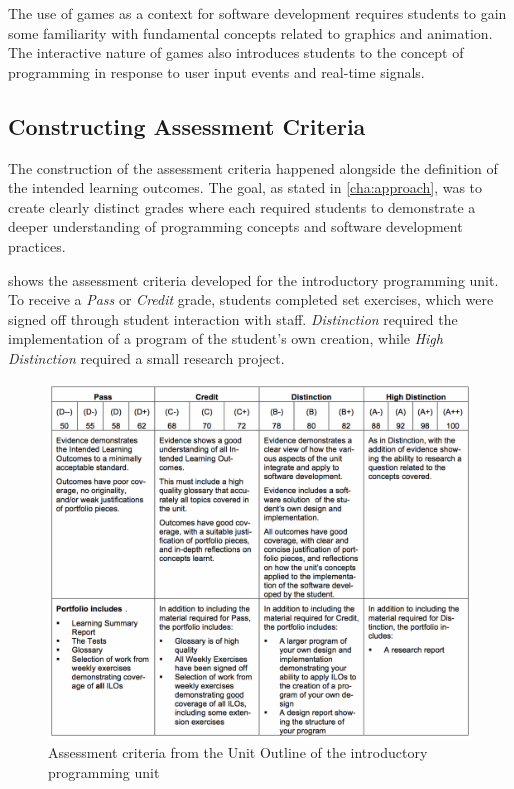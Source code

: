The use of games as a context for software development requires students to gain some familiarity with fundamental concepts related to graphics and animation. The interactive nature of games also introduces students to the concept of programming in response to user input events and real-time signals.


\subsection{Constructing Assessment Criteria} %
\label{sub:intro_constructing_assessment_criteria}

The construction of the assessment criteria happened alongside the definition of the intended learning outcomes. The goal, as stated in \cref{cha:approach}, was to create clearly distinct grades where each required students to demonstrate a deeper understanding of programming concepts and software development practices. 

 shows the assessment criteria developed for the introductory programming unit. To receive a \emph{Pass} or \emph{Credit} grade, students completed set exercises, which were signed off through student interaction with staff. \emph{Distinction} required the implementation of a program of the student's own creation, while \emph{High Distinction} required a small research project.

\begin{figure}[htbp]
	\centering
	\includegraphics[width=\textwidth]{AssessmentCriteria}
	\caption{Assessment criteria from the Unit Outline of the introductory programming unit}
	\label{fig:assessment_criteria}
\end{figure}

